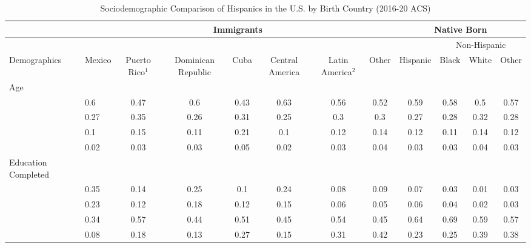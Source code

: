 \documentclass[
]{article}
\begin{document}
\begin{landscape}

\begin{table}[ht]
\centering
\begin{threeparttable}
\caption{Sociodemographic Comparison of Hispanics in the U.S. by Birth Country (2016-20 ACS)} 
\begingroup\small
\begin{tabular}{>{\raggedright\arraybackslash}p{3.2cm}|lcccccc|cccc}
& \multicolumn{7}{c|}{Immigrants} & \multicolumn{4}{c}{Native Born} \\
\cline{2-12}
& \multicolumn{7}{c|}{} & \multicolumn{1}{c}{} & \multicolumn{3}{c}{Non-Hispanic} \\
  \hline
Demographics & Mexico & Puerto Rico$^1$ & Dominican Republic & Cuba & Central America & Latin America$^2$ & Other & Hispanic & Black & White & Other \\ 
  \hline
Age &  &  &  &  &  &  &  &  &  &  &  \\ 
  \multicolumn{1}{>{\raggedleft\arraybackslash}p{1.5cm}|}{\makebox[1.5cm][r]{60 - 69 }}& 0.6 & 0.47 & 0.6 & 0.43 & 0.63 & 0.56 & 0.52 & 0.59 & 0.58 & 0.5 & 0.57 \\ 
  \multicolumn{1}{>{\raggedleft\arraybackslash}p{1.5cm}|}{\makebox[1.5cm][r]{70 - 79 }}& 0.27 & 0.35 & 0.26 & 0.31 & 0.25 & 0.3 & 0.3 & 0.27 & 0.28 & 0.32 & 0.28 \\ 
  \multicolumn{1}{>{\raggedleft\arraybackslash}p{1.5cm}|}{\makebox[1.5cm][r]{80 - 89 }}& 0.1 & 0.15 & 0.11 & 0.21 & 0.1 & 0.12 & 0.14 & 0.12 & 0.11 & 0.14 & 0.12 \\ 
  \multicolumn{1}{>{\raggedleft\arraybackslash}p{1.5cm}|}{\makebox[1.5cm][r]{90 plus }}& 0.02 & 0.03 & 0.03 & 0.05 & 0.02 & 0.03 & 0.04 & 0.03 & 0.03 & 0.04 & 0.03 \\ 
  Education Completed &  &  &  &  &  &  &  &  &  &  &  \\ 
  \multicolumn{1}{>{\raggedleft\arraybackslash}p{3.2cm}|}{\makebox[3.2cm][r]{Less than Primary }}& 0.35 & 0.14 & 0.25 & 0.1 & 0.24 & 0.08 & 0.09 & 0.07 & 0.03 & 0.01 & 0.03 \\ 
  \multicolumn{1}{>{\raggedleft\arraybackslash}p{1.7cm}|}{\makebox[1.7cm][r]{Primary }}& 0.23 & 0.12 & 0.18 & 0.12 & 0.15 & 0.06 & 0.05 & 0.06 & 0.04 & 0.02 & 0.03 \\ 
  \multicolumn{1}{>{\raggedleft\arraybackslash}p{2cm}|}{\makebox[2cm][r]{Secondary }}& 0.34 & 0.57 & 0.44 & 0.51 & 0.45 & 0.54 & 0.45 & 0.64 & 0.69 & 0.59 & 0.57 \\ 
  \multicolumn{1}{>{\raggedleft\arraybackslash}p{2cm}|}{\makebox[2cm][r]{University }}& 0.08 & 0.18 & 0.13 & 0.27 & 0.15 & 0.31 & 0.42 & 0.23 & 0.25 & 0.39 & 0.38 \\ 

\end{tabular}
\end{threeparttable}
\end{table}
\end{landscape}
\end{document}
